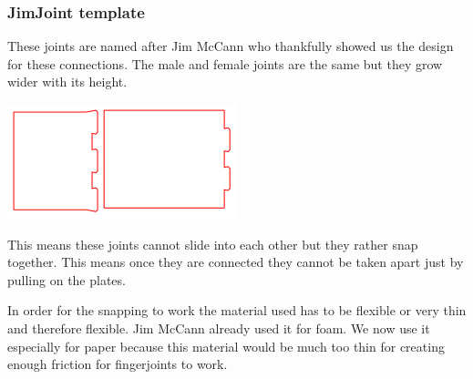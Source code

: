 \documentclass[../ClassicThesis.tex]{subfiles}
\begin{document}
\subsubsection{JimJoint template}
    \begin{minipage}{0.6\textwidth}
    
    These joints are named after Jim McCann who thankfully showed us the design for these connections.
    The male and female joints are the same but they grow wider with its height.
    \end{minipage}
    \begin{minipage}{0.4\textwidth}
    \includegraphics[width=1\columnwidth]{Images/jimjoints.png}
    \end{minipage}
    This means these joints cannot slide into each other but they rather snap together. This means once they are connected they cannot be taken apart just by pulling on the plates. 
    
    In order for the snapping to work the material used has to be flexible or very thin and therefore flexible. Jim McCann already used it for foam. We now use it especially for paper because this material would be much too thin for creating enough friction for fingerjoints to work.
\end{document}
